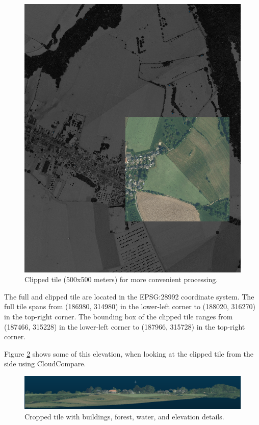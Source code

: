 \documentclass{article}
\begin{document}
\begin{figure}[h]
  \centering
  \includegraphics[width=0.8\linewidth]{img/screenshot_cropped_front.png}
  \caption{Clipped tile (500x500 meters) for more convenient processing.}
  \label{fig:cropped_front}
\end{figure}
The full and clipped tile are located in the EPSG:28992 coordinate system. The full tile spans from (186980, 314980) in the lower-left corner to (188020, 316270) in the top-right corner. The bounding box of the clipped tile ranges from (187466, 315228) in the lower-left corner to (187966, 315728) in the top-right corner.


Figure \ref{fig:cropped_elevation} shows some of this elevation, when looking at the clipped tile from the side using CloudCompare.

\begin{figure}[h]
  \centering
  \includegraphics[width=0.8\linewidth]{img/screenshot_cropped_elevation.png}
  \caption{Cropped tile with buildings, forest, water, and elevation details.}
  \label{fig:cropped_elevation}
\end{figure}
\newpage
\end{document}
